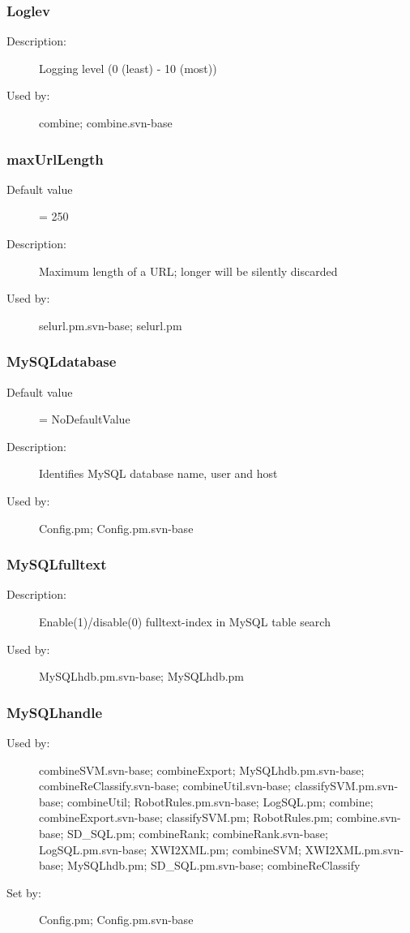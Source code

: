 \subsubsection{Loglev}
\label{Loglev}
\begin{description}
\item[Description:] Logging level (0 (least) - 10 (most))
\item[Used by:] combine; combine.svn-base
\end{description}
\subsubsection{maxUrlLength}
\label{maxUrlLength}
\begin{description}
\item[Default value] = 250
\item[Description:] Maximum length of a URL; longer will be silently discarded
\item[Used by:] selurl.pm.svn-base; selurl.pm
\end{description}
\subsubsection{MySQLdatabase}
\label{MySQLdatabase}
\begin{description}
\item[Default value] = NoDefaultValue
\item[Description:] Identifies MySQL database name, user and host
\item[Used by:] Config.pm; Config.pm.svn-base
\end{description}
\subsubsection{MySQLfulltext}
\label{MySQLfulltext}
\begin{description}
\item[Description:] Enable(1)/disable(0) fulltext-index in MySQL table search
\item[Used by:] MySQLhdb.pm.svn-base; MySQLhdb.pm
\end{description}
\subsubsection{MySQLhandle}
\label{MySQLhandle}
\begin{description}
\item[Used by:] combineSVM.svn-base; combineExport; MySQLhdb.pm.svn-base; combineReClassify.svn-base; combineUtil.svn-base; classifySVM.pm.svn-base; combineUtil; RobotRules.pm.svn-base; LogSQL.pm; combine; combineExport.svn-base; classifySVM.pm; RobotRules.pm; combine.svn-base; SD\_SQL.pm; combineRank; combineRank.svn-base; LogSQL.pm.svn-base; XWI2XML.pm; combineSVM; XWI2XML.pm.svn-base; MySQLhdb.pm; SD\_SQL.pm.svn-base; combineReClassify
\item[Set by:] Config.pm; Config.pm.svn-base
\end{description}
